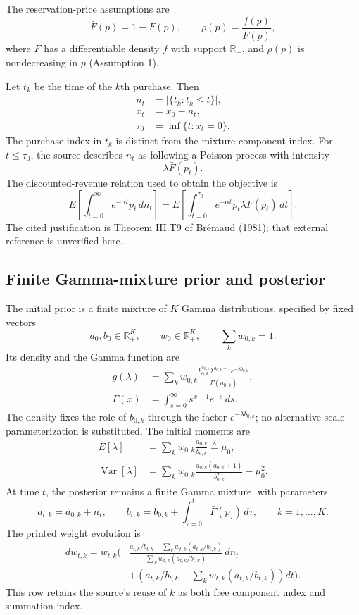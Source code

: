 \documentclass{article}
\begin{document}
The reservation-price assumptions are
\[
\bar F(p)=1-F(p),\qquad
\rho(p)=\frac{f(p)}{\bar F(p)},
\]
where \(F\) has a differentiable density \(f\) with support \(\mathbb R_+\), and \(\rho(p)\) is nondecreasing in \(p\) (Assumption 1).

Let \(t_k\) be the time of the \(k\)th purchase. Then
\begin{align*}
n_t&=\bigl|\{t_k:t_k\leq t\}\bigr|,\\
x_t&=x_0-n_t,\\
\tau_0&=\inf\{t:x_t=0\}.
\end{align*}
The purchase index in \(t_k\) is distinct from the mixture-component index. For \(t\leq\tau_0\), the source describes \(n_t\) as following a Poisson process with intensity
\[
\lambda\bar F(p_t).
\]
The discounted-revenue relation used to obtain the objective is
\[
E\left[\int_{t=0}^{\infty}e^{-\alpha t}p_t\,dn_t\right]
=
E\left[\int_{t=0}^{\tau_0}e^{-\alpha t}p_t\lambda\bar F(p_t)\,dt\right].
\]
The cited justification is Theorem III.T9 of Br\'emaud (1981); that external reference is unverified here.

\subsection*{Finite Gamma-mixture prior and posterior}
The initial prior is a finite mixture of \(K\) Gamma distributions, specified by fixed vectors
\[
a_0,b_0\in\mathbb R_+^K,\qquad
w_0\in\mathbb R_+^K,\qquad
\sum_k w_{0,k}=1.
\]
Its density and the Gamma function are
\begin{align*}
g(\lambda)
&=\sum_k w_{0,k}
\frac{b_{0,k}^{a_{0,k}}\lambda^{a_{0,k}-1}e^{-\lambda b_{0,k}}}
{\Gamma(a_{0,k})},\\
\Gamma(x)&=\int_{s=0}^{\infty}s^{x-1}e^{-s}\,ds.
\end{align*}
The density fixes the role of \(b_{0,k}\) through the factor \(e^{-\lambda b_{0,k}}\); no alternative scale parameterization is substituted. The initial moments are
\begin{align*}
E[\lambda]&=\sum_k w_{0,k}\frac{a_{0,k}}{b_{0,k}}\triangleq\mu_0,\\
\operatorname{Var}[\lambda]
&=\sum_k w_{0,k}\frac{a_{0,k}(a_{0,k}+1)}{b_{0,k}^2}-\mu_0^2.
\end{align*}
At time \(t\), the posterior remains a finite Gamma mixture, with parameters
\[
a_{t,k}=a_{0,k}+n_t,
\qquad
b_{t,k}=b_{0,k}+\int_{\tau=0}^{t}\bar F(p_\tau)\,d\tau,
\qquad k=1,\ldots,K.
\]
The printed weight evolution is
\[
\begin{aligned}
dw_{t,k}=w_{t,k}\Bigg(&
\frac{a_{t,k}/b_{t,k}-\sum_k w_{t,k}(a_{t,k}/b_{t,k})}
{\sum_k w_{t,k}(a_{t,k}/b_{t,k})}\,dn_t\\
&+\left(a_{t,k}/b_{t,k}-\sum_k w_{t,k}(a_{t,k}/b_{t,k})\right)dt
\Bigg).
\end{aligned}
\]
This row retains the source's reuse of \(k\) as both free component index and summation index.
\end{document}
